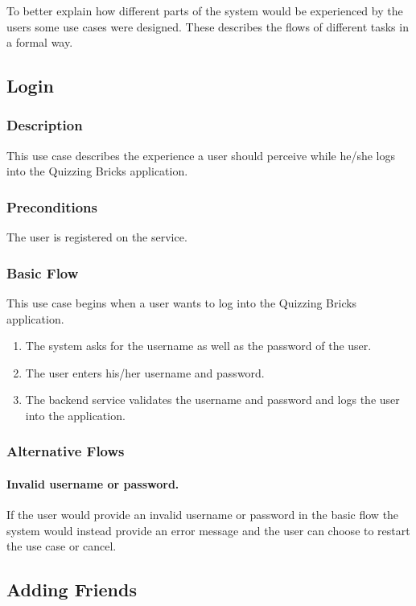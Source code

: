 To better explain how different parts of the system would be experienced by the users some use cases were designed. These describes the flows of different tasks in a formal way.

\subsection{Login}

\subsubsection{Description}
This use case describes the experience a user should perceive while he/she logs into the Quizzing Bricks application.

\subsubsection{Preconditions}
The user is registered on the service.

\subsubsection{Basic Flow}
This use case begins when a user wants to log into the Quizzing Bricks application.
\begin{enumerate}
	\item The system asks for the username as well as the password of the user.
	\item The user enters his/her username and password.
	\item The backend service validates the username and password and logs the user into the application.
\end{enumerate}

\subsubsection{Alternative Flows}

\paragraph{Invalid username or password.} 
If the user would provide an invalid username or password in the basic flow the system would instead provide an error message and the user can choose to restart the use case or cancel.


\subsection{Adding Friends}

